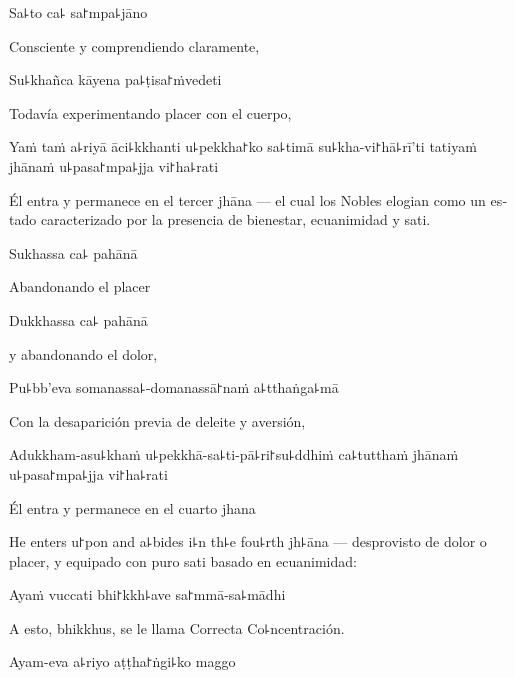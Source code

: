 Sa꜕to ca꜕ sa꜓mpa꜕jāno

\begin{english}
	Consciente y comprendiendo claramente,
\end{english}

Su꜕khañca kāyena pa꜕ṭisa꜓ṁvedeti

\begin{english}
	Todavía experimentando placer con el cuerpo,
\end{english}

Yaṁ taṁ a꜕riyā āci꜕kkhanti u꜕pekkha꜓ko sa꜕timā su꜕kha-vi꜓hā꜕rī'ti tatiyaṁ jhānaṁ u꜕pasa꜓mpa꜕jja vi꜓ha꜕rati

\begin{english}
	Él entra y permanece en el tercer jhāna --- el cual los Nobles elogian como un estado caracterizado por la presencia de bienestar, ecuanimidad y sati.
\end{english}

Sukhassa ca꜕ pahānā

\begin{english}
	Abandonando el placer
\end{english}

Dukkhassa ca꜕ pahānā

\begin{english}
	y abandonando el dolor,
\end{english}

Pu꜕bb'eva somanassa꜕-domanassā꜓naṁ a꜕tthaṅga꜕mā

\begin{english}
	Con la desaparición previa de deleite y aversión,
\end{english}

Adukkham-asu꜕khaṁ u꜕pekkhā-sa꜕ti-pā꜕ri꜓su꜕ddhiṁ ca꜕tutthaṁ jhānaṁ u꜕pasa꜓mpa꜕jja vi꜓ha꜕rati

\begin{english}
	Él entra y permanece en el cuarto jhana
	
	He enters u꜓pon and a꜕bides i꜕n th꜕e fou꜕rth jh꜕āna --- desprovisto de dolor o placer, y equipado con puro sati basado en ecuanimidad:
\end{english}

Ayaṁ vuccati bhi꜓kkh꜕ave sa꜓mmā-sa꜕mādhi

\begin{english}
	A esto, bhikkhus, se le llama Correcta Co꜕ncentración.
\end{english}

Ayam-eva a꜕riyo aṭṭha꜓ṅgi꜕ko maggo

